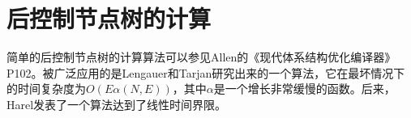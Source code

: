 \section{后控制节点树的计算}\label{app:algo_ipdom_tree}

简单的后控制节点树的计算算法可以参见Allen的《现代体系结构优化编译器》P102。被广泛应用的是Lengauer和Tarjan研究出来的一个算法\cite{Lengauer1979}，它在最坏情况下的时间复杂度为$O\left(E\alpha\left(N,E\right)\right)$，其中$\alpha$是一个增长非常缓慢的函数。后来，Harel发表了一个算法达到了线性时间界限\cite{Harel1985}。